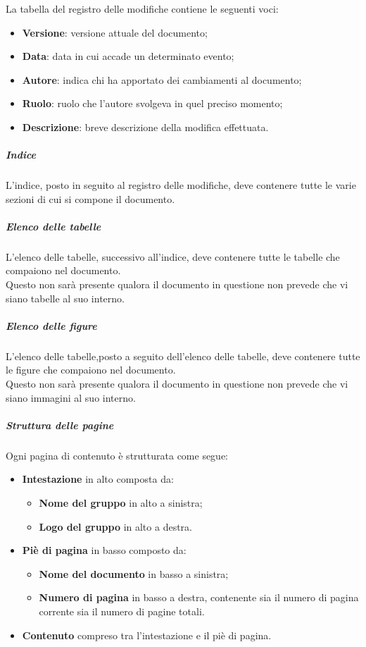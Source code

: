 La tabella del registro delle modifiche contiene le seguenti voci:
\begin{itemize}
    \item \textbf{Versione}: versione attuale del documento;
    \item \textbf{Data}: data in cui accade un determinato evento;
    \item \textbf{Autore}: indica chi ha apportato dei cambiamenti al documento;
    \item \textbf{Ruolo}: ruolo che l'autore svolgeva in quel preciso momento;
    \item \textbf{Descrizione}: breve descrizione della modifica effettuata.
\end {itemize}
\subparagraph{Indice}
L'indice, posto in seguito al registro delle modifiche, deve contenere tutte le varie sezioni di cui si compone il documento.
\subparagraph{Elenco delle tabelle}
L'elenco delle tabelle, successivo all'indice, deve contenere tutte le tabelle che compaiono nel documento.\\
Questo non sarà presente qualora il documento in questione non prevede che vi siano tabelle al suo interno.
\subparagraph{Elenco delle figure}
L'elenco delle tabelle,posto a seguito dell'elenco delle tabelle, deve contenere tutte le figure che compaiono nel documento.\\
Questo non sarà presente qualora il documento in questione non prevede che vi siano immagini al suo interno.

\subparagraph{Struttura delle pagine}
Ogni pagina di contenuto è strutturata come segue:
\begin {itemize}
    \item \textbf{Intestazione} in alto composta da:
    \begin {itemize}
        \item \textbf{Nome del gruppo} in alto a sinistra;
        \item \textbf{Logo del gruppo} in alto a destra.
    \end{itemize}
    \item \textbf{Piè di pagina} in basso composto da:
    \begin{itemize}
        \item \textbf{Nome del documento} in basso a sinistra;
        \item \textbf{Numero di pagina} in basso a destra, contenente sia il numero di pagina corrente sia il numero di pagine totali.
    \end {itemize}
    \item \textbf{Contenuto} compreso tra l'intestazione e il piè di pagina.
\end {itemize}

